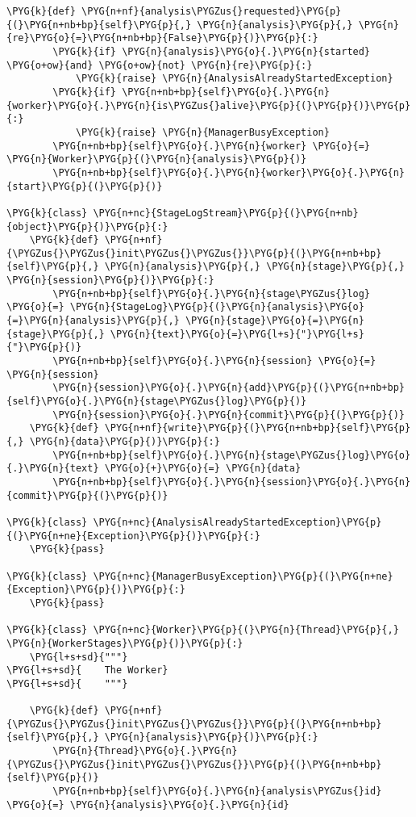 \begin{Verbatim}[commandchars=\\\{\}]
    \PYG{k}{def} \PYG{n+nf}{analysis\PYGZus{}requested}\PYG{p}{(}\PYG{n+nb+bp}{self}\PYG{p}{,} \PYG{n}{analysis}\PYG{p}{,} \PYG{n}{re}\PYG{o}{=}\PYG{n+nb+bp}{False}\PYG{p}{)}\PYG{p}{:}
        \PYG{k}{if} \PYG{n}{analysis}\PYG{o}{.}\PYG{n}{started} \PYG{o+ow}{and} \PYG{o+ow}{not} \PYG{n}{re}\PYG{p}{:}
            \PYG{k}{raise} \PYG{n}{AnalysisAlreadyStartedException}
        \PYG{k}{if} \PYG{n+nb+bp}{self}\PYG{o}{.}\PYG{n}{worker}\PYG{o}{.}\PYG{n}{is\PYGZus{}alive}\PYG{p}{(}\PYG{p}{)}\PYG{p}{:}
            \PYG{k}{raise} \PYG{n}{ManagerBusyException}
        \PYG{n+nb+bp}{self}\PYG{o}{.}\PYG{n}{worker} \PYG{o}{=} \PYG{n}{Worker}\PYG{p}{(}\PYG{n}{analysis}\PYG{p}{)}
        \PYG{n+nb+bp}{self}\PYG{o}{.}\PYG{n}{worker}\PYG{o}{.}\PYG{n}{start}\PYG{p}{(}\PYG{p}{)}

\PYG{k}{class} \PYG{n+nc}{StageLogStream}\PYG{p}{(}\PYG{n+nb}{object}\PYG{p}{)}\PYG{p}{:}
    \PYG{k}{def} \PYG{n+nf}{\PYGZus{}\PYGZus{}init\PYGZus{}\PYGZus{}}\PYG{p}{(}\PYG{n+nb+bp}{self}\PYG{p}{,} \PYG{n}{analysis}\PYG{p}{,} \PYG{n}{stage}\PYG{p}{,} \PYG{n}{session}\PYG{p}{)}\PYG{p}{:}
        \PYG{n+nb+bp}{self}\PYG{o}{.}\PYG{n}{stage\PYGZus{}log} \PYG{o}{=} \PYG{n}{StageLog}\PYG{p}{(}\PYG{n}{analysis}\PYG{o}{=}\PYG{n}{analysis}\PYG{p}{,} \PYG{n}{stage}\PYG{o}{=}\PYG{n}{stage}\PYG{p}{,} \PYG{n}{text}\PYG{o}{=}\PYG{l+s}{"}\PYG{l+s}{"}\PYG{p}{)}
        \PYG{n+nb+bp}{self}\PYG{o}{.}\PYG{n}{session} \PYG{o}{=} \PYG{n}{session}
        \PYG{n}{session}\PYG{o}{.}\PYG{n}{add}\PYG{p}{(}\PYG{n+nb+bp}{self}\PYG{o}{.}\PYG{n}{stage\PYGZus{}log}\PYG{p}{)}
        \PYG{n}{session}\PYG{o}{.}\PYG{n}{commit}\PYG{p}{(}\PYG{p}{)}
    \PYG{k}{def} \PYG{n+nf}{write}\PYG{p}{(}\PYG{n+nb+bp}{self}\PYG{p}{,} \PYG{n}{data}\PYG{p}{)}\PYG{p}{:}
        \PYG{n+nb+bp}{self}\PYG{o}{.}\PYG{n}{stage\PYGZus{}log}\PYG{o}{.}\PYG{n}{text} \PYG{o}{+}\PYG{o}{=} \PYG{n}{data}
        \PYG{n+nb+bp}{self}\PYG{o}{.}\PYG{n}{session}\PYG{o}{.}\PYG{n}{commit}\PYG{p}{(}\PYG{p}{)}

\PYG{k}{class} \PYG{n+nc}{AnalysisAlreadyStartedException}\PYG{p}{(}\PYG{n+ne}{Exception}\PYG{p}{)}\PYG{p}{:}
    \PYG{k}{pass}

\PYG{k}{class} \PYG{n+nc}{ManagerBusyException}\PYG{p}{(}\PYG{n+ne}{Exception}\PYG{p}{)}\PYG{p}{:}
    \PYG{k}{pass}

\PYG{k}{class} \PYG{n+nc}{Worker}\PYG{p}{(}\PYG{n}{Thread}\PYG{p}{,} \PYG{n}{WorkerStages}\PYG{p}{)}\PYG{p}{:}
    \PYG{l+s+sd}{"""}
\PYG{l+s+sd}{    The Worker}
\PYG{l+s+sd}{    """}

    \PYG{k}{def} \PYG{n+nf}{\PYGZus{}\PYGZus{}init\PYGZus{}\PYGZus{}}\PYG{p}{(}\PYG{n+nb+bp}{self}\PYG{p}{,} \PYG{n}{analysis}\PYG{p}{)}\PYG{p}{:}
        \PYG{n}{Thread}\PYG{o}{.}\PYG{n}{\PYGZus{}\PYGZus{}init\PYGZus{}\PYGZus{}}\PYG{p}{(}\PYG{n+nb+bp}{self}\PYG{p}{)}
        \PYG{n+nb+bp}{self}\PYG{o}{.}\PYG{n}{analysis\PYGZus{}id} \PYG{o}{=} \PYG{n}{analysis}\PYG{o}{.}\PYG{n}{id}


\end{Verbatim}
